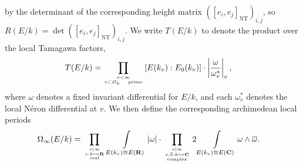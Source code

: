 \documentclass{amsart}
\theoremstyle{definition}
\theoremstyle{definition}
\theoremstyle{definition}
\begin{document}
by the determinant of the corresponding height matrix $( \left[ e_i, e_j\right]_{\operatorname{NT}})_{i,j}$, so $R(E/k) = \det \left( \left[ e_i, e_j \right]_{\operatorname{NT}} \right)_{i,j}$.
We write $T(E/k)$ to denote the product over the local Tamagawa factors, 
\begin{align*} T(E/k) &= \prod\limits_{v < \infty \atop v \subset \mathcal{O}_k ~~~\text{prime}} 
\left[  E(k_v) : E_0(k_v) \right] \cdot \left\vert \frac{\omega}{\omega_v^*} \right\vert_v,\end{align*}
where $\omega$ denotes a fixed invariant differential for $E/k$, and each $\omega_v^*$ denotes 
the local N\'eron differential at $v$. We then define the corresponding archimedean local periods
\begin{align*} \Omega_{\infty}(E/k) 
&= \prod\limits_{  {v \mid \infty \atop v: k \hookrightarrow {\bf{R}} } \atop \text{real}} \int\limits_{E(k_v) \cong E({\bf{R}})} \vert \omega \vert 
\cdot \prod\limits_{ { v\mid \infty \atop v, \overline{v}: k \hookrightarrow {\bf{C}} } \atop \text{complex} } 2 \int\limits_{E(k_v) \cong E({\bf{C}})}
\omega \wedge \overline{\omega}. \end{align*}
\end{document}

